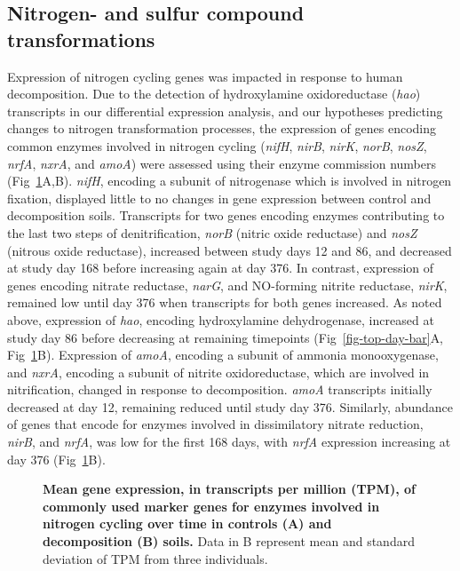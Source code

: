 \documentclass[
  sn-nature,
  lineno, referee]{sn-jnl}
\begin{document}
\subsection{Nitrogen- and sulfur compound
transformations}\label{nitrogen--and-sulfur-compound-transformations}

Expression of nitrogen cycling genes was impacted in response to human
decomposition. Due to the detection of hydroxylamine oxidoreductase
(\emph{hao}) transcripts in our differential expression analysis, and
our hypotheses predicting changes to nitrogen transformation processes,
the expression of genes encoding common enzymes involved in nitrogen
cycling (\emph{nifH}, \emph{nirB}, \emph{nirK}, \emph{norB},
\emph{nosZ}, \emph{nrfA}, \emph{nxrA}, and \emph{amoA}) were assessed
using their enzyme commission numbers (Fig~\ref{fig-n-genes}A,B).
\emph{nifH}, encoding a subunit of nitrogenase which is involved in
nitrogen fixation, displayed little to no changes in gene expression
between control and decomposition soils. Transcripts for two genes
encoding enzymes contributing to the last two steps of denitrification,
\emph{norB} (nitric oxide reductase) and \emph{nosZ} (nitrous oxide
reductase), increased between study days 12 and 86, and decreased at
study day 168 before increasing again at day 376. In contrast,
expression of genes encoding nitrate reductase, \emph{narG}, and
NO-forming nitrite reductase, \emph{nirK}, remained low until day 376
when transcripts for both genes increased. As noted above, expression of
\emph{hao}, encoding hydroxylamine dehydrogenase, increased at study day
86 before decreasing at remaining timepoints
(Fig~\ref{fig-top-day-bar}A, Fig~\ref{fig-n-genes}B). Expression of
\emph{amoA}, encoding a subunit of ammonia monooxygenase, and
\emph{nxrA}, encoding a subunit of nitrite oxidoreductase, which are
involved in nitrification, changed in response to decomposition.
\emph{amoA} transcripts initially decreased at day 12, remaining reduced
until study day 376. Similarly, abundance of genes that encode for
enzymes involved in dissimilatory nitrate reduction, \emph{nirB}, and
\emph{nrfA}, was low for the first 168 days, with \emph{nrfA} expression
increasing at day 376 (Fig~\ref{fig-n-genes}B).

\begin{figure}[!h]
\caption{{\bf Mean gene expression, in transcripts per million (TPM), of commonly used marker genes for enzymes involved in nitrogen cycling over time in controls (A) and decomposition (B) soils.}
Data in B represent mean and standard deviation of TPM from three individuals.}
\label{fig-n-genes}
\end{figure}
\end{document}
